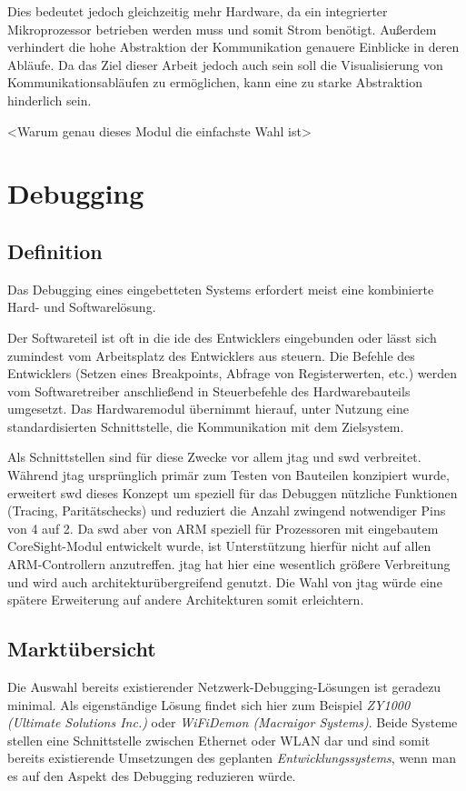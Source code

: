 Dies bedeutet jedoch gleichzeitig mehr Hardware, da ein integrierter
Mikroprozessor betrieben werden muss und somit Strom benötigt.
Außerdem verhindert die hohe Abstraktion der Kommunikation genauere Einblicke in
deren Abläufe. Da das Ziel dieser Arbeit jedoch auch sein soll die
Visualisierung von Kommunikationsabläufen zu ermöglichen, kann eine zu starke
Abstraktion hinderlich sein.


 <Warum genau dieses Modul die einfachste Wahl ist>

\section{Debugging}
\subsection{Definition}
Das Debugging eines eingebetteten Systems erfordert meist eine kombinierte Hard-
und Softwarelösung.

Der Softwareteil ist oft in die \gls{ide} des Entwicklers eingebunden oder lässt
sich zumindest vom Arbeitsplatz des Entwicklers aus steuern. Die Befehle des
Entwicklers (Setzen eines Breakpoints, Abfrage von Registerwerten, etc.) werden
vom Softwaretreiber anschließend in Steuerbefehle des Hardwarebauteils
umgesetzt. Das Hardwaremodul übernimmt hierauf, unter Nutzung eine
standardisierten Schnittstelle, die Kommunikation mit dem Zielsystem.

Als Schnittstellen sind für diese Zwecke vor allem \gls{jtag} und \gls{swd}
verbreitet. Während \gls{jtag} ursprünglich primär zum Testen von Bauteilen
konzipiert wurde, erweitert \gls{swd} dieses Konzept um speziell für das
Debuggen nützliche Funktionen (Tracing, Paritätschecks) und reduziert die Anzahl
zwingend notwendiger Pins von 4 auf 2. Da \gls{swd} aber von
ARM speziell für Prozessoren mit eingebautem CoreSight-Modul entwickelt wurde,
ist Unterstützung hierfür nicht auf allen ARM-Controllern anzutreffen. \gls{jtag}
hat hier eine wesentlich größere Verbreitung und wird auch
architekturübergreifend genutzt. Die Wahl von \gls{jtag} würde eine spätere
Erweiterung auf andere Architekturen somit erleichtern.
\subsection{Marktübersicht}
Die Auswahl bereits existierender Netzwerk-Debugging-Lösungen ist geradezu
minimal.
Als eigenständige Lösung findet sich hier zum Beispiel \emph{ZY1000 (Ultimate
Solutions Inc.)}\cite{ULT} oder \emph{WiFiDemon (Macraigor Systems)}\cite{MAC}.
Beide Systeme stellen eine Schnittstelle zwischen Ethernet oder WLAN dar und sind somit
bereits existierende Umsetzungen des geplanten \emph{Entwicklungssystems}, wenn
man es auf den Aspekt des Debugging reduzieren würde.

